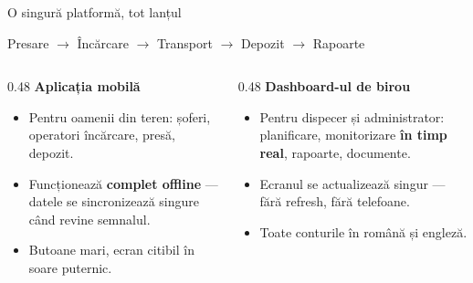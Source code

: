 \documentclass[aspectratio=169,10pt]{beamer}
\begin{document}
\begin{frame}{O singură platformă, tot lanțul}
  \vspace{0.2cm}
  \begin{center}
  {\sffamily\large\color{sbInk} Presare $\rightarrow$ Încărcare $\rightarrow$ Transport $\rightarrow$ Depozit $\rightarrow$ Rapoarte}
  \end{center}
  \vspace{0.5cm}
  \begin{columns}[T]
    \begin{column}{0.48\linewidth}
      {\sffamily\bfseries\color{sbTerra} Aplicația mobilă}\\[0.2cm]
      \begin{itemize}
        \item Pentru oamenii din teren: șoferi, operatori încărcare, presă, depozit.
        \item Funcționează \textbf{complet offline} — datele se sincronizează singure când revine semnalul.
        \item Butoane mari, ecran citibil în soare puternic.
      \end{itemize}
    \end{column}
    \begin{column}{0.48\linewidth}
      {\sffamily\bfseries\color{sbTerra} Dashboard-ul de birou}\\[0.2cm]
      \begin{itemize}
        \item Pentru dispecer și administrator: planificare, monitorizare \textbf{în timp real}, rapoarte, documente.
        \item Ecranul se actualizează singur — fără refresh, fără telefoane.
        \item Toate conturile în română și engleză.
      \end{itemize}
    \end{column}
  \end{columns}
\end{frame}
\end{document}
